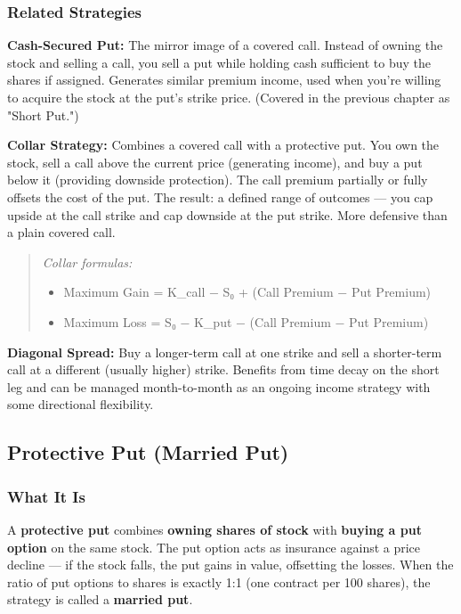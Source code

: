 \documentclass[12pt,openany]{book}
\begin{document}
\subsubsection{Related Strategies}

\textbf{Cash-Secured Put:} The mirror image of a covered call. Instead of owning the stock and selling a call, you sell a put while holding cash sufficient to buy the shares if assigned. Generates similar premium income, used when you're willing to acquire the stock at the put's strike price. (Covered in the previous chapter as "Short Put.")

\textbf{Collar Strategy:} Combines a covered call with a protective put. You own the stock, sell a call above the current price (generating income), and buy a put below it (providing downside protection). The call premium partially or fully offsets the cost of the put. The result: a defined range of outcomes — you cap upside at the call strike and cap downside at the put strike. More defensive than a plain covered call.

\begin{quote}
\emph{Collar formulas:}
\begin{itemize}[leftmargin=*]
    \item Maximum Gain = K\_call − S₀ + (Call Premium − Put Premium)
    \item Maximum Loss = S₀ − K\_put − (Call Premium − Put Premium)
\end{itemize}
\end{quote}

\textbf{Diagonal Spread:} Buy a longer-term call at one strike and sell a shorter-term call at a different (usually higher) strike. Benefits from time decay on the short leg and can be managed month-to-month as an ongoing income strategy with some directional flexibility.



\subsection{Protective Put (Married Put)}

\subsubsection{What It Is}

A \textbf{protective put} combines \textbf{owning shares of stock} with \textbf{buying a put option} on the same stock. The put option acts as insurance against a price decline — if the stock falls, the put gains in value, offsetting the losses. When the ratio of put options to shares is exactly 1:1 (one contract per 100 shares), the strategy is called a \textbf{married put}.
\end{document}
